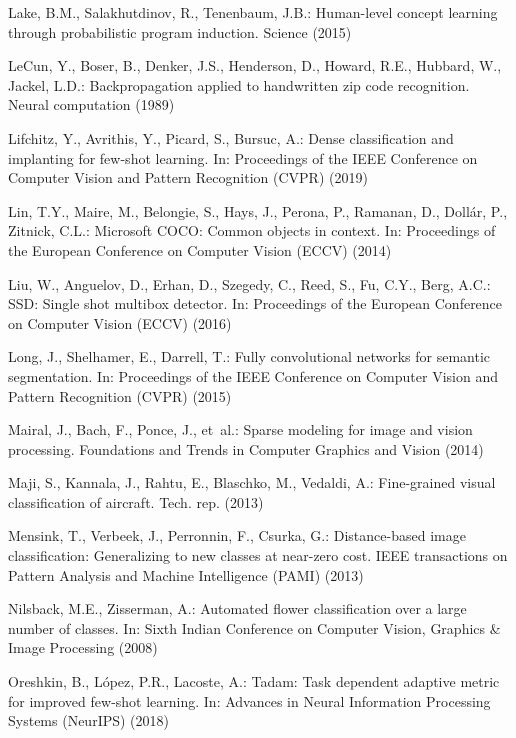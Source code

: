 \documentclass[runningheads]{llncs}
\begin{document}
\begin{thebibliography}{10}
Lake, B.M., Salakhutdinov, R., Tenenbaum, J.B.: Human-level concept learning
  through probabilistic program induction. Science  (2015)

LeCun, Y., Boser, B., Denker, J.S., Henderson, D., Howard, R.E., Hubbard, W.,
  Jackel, L.D.: Backpropagation applied to handwritten zip code recognition.
  Neural computation  (1989)

Lifchitz, Y., Avrithis, Y., Picard, S., Bursuc, A.: Dense classification and
  implanting for few-shot learning. In: Proceedings of the IEEE Conference on
  Computer Vision and Pattern Recognition (CVPR) (2019)

Lin, T.Y., Maire, M., Belongie, S., Hays, J., Perona, P., Ramanan, D.,
  Doll{\'a}r, P., Zitnick, C.L.: Microsoft {COCO}: Common objects in context.
  In: Proceedings of the European Conference on Computer Vision (ECCV) (2014)

Liu, W., Anguelov, D., Erhan, D., Szegedy, C., Reed, S., Fu, C.Y., Berg, A.C.:
  {SSD}: Single shot multibox detector. In: Proceedings of the European
  Conference on Computer Vision (ECCV) (2016)

Long, J., Shelhamer, E., Darrell, T.: Fully convolutional networks for semantic
  segmentation. In: Proceedings of the IEEE Conference on Computer Vision and
  Pattern Recognition (CVPR) (2015)

Mairal, J., Bach, F., Ponce, J., et~al.: Sparse modeling for image and vision
  processing. Foundations and Trends{\textregistered} in Computer Graphics and
  Vision  (2014)

Maji, S., Kannala, J., Rahtu, E., Blaschko, M., Vedaldi, A.: Fine-grained
  visual classification of aircraft. Tech. rep. (2013)

Mensink, T., Verbeek, J., Perronnin, F., Csurka, G.: Distance-based image
  classification: Generalizing to new classes at near-zero cost. IEEE
  transactions on Pattern Analysis and Machine Intelligence (PAMI)  (2013)

Nilsback, M.E., Zisserman, A.: Automated flower classification over a large
  number of classes. In: Sixth Indian Conference on Computer Vision, Graphics
  \& Image Processing (2008)

Oreshkin, B., L{\'o}pez, P.R., Lacoste, A.: Tadam: Task dependent adaptive
  metric for improved few-shot learning. In: Advances in Neural Information
  Processing Systems (NeurIPS) (2018)


\end{thebibliography}
\end{document}
